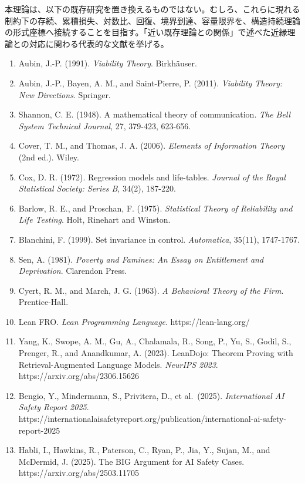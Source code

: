 \documentclass[12pt,a4paper]{article}
\begin{document}
本理論は、以下の既存研究を置き換えるものではない。むしろ、これらに現れる制約下の存続、累積損失、対数比、回復、境界到達、容量限界を、構造持続理論の形式座標へ接続することを目指す。「近い既存理論との関係」で述べた近縁理論との対応に関わる代表的な文献を挙げる。

\begin{enumerate}
\def\labelenumi{\arabic{enumi}.}
\tightlist
\item
  Aubin, J.-P. (1991). \emph{Viability Theory}. Birkhäuser.
\item
  Aubin, J.-P., Bayen, A. M., and Saint-Pierre, P. (2011). \emph{Viability Theory: New Directions}. Springer.
\item
  Shannon, C. E. (1948). A mathematical theory of communication. \emph{The Bell System Technical Journal}, 27, 379-423, 623-656.
\item
  Cover, T. M., and Thomas, J. A. (2006). \emph{Elements of Information Theory} (2nd ed.). Wiley.
\item
  Cox, D. R. (1972). Regression models and life-tables. \emph{Journal of the Royal Statistical Society: Series B}, 34(2), 187-220.
\item
  Barlow, R. E., and Proschan, F. (1975). \emph{Statistical Theory of Reliability and Life Testing}. Holt, Rinehart and Winston.
\item
  Blanchini, F. (1999). Set invariance in control. \emph{Automatica}, 35(11), 1747-1767.
\item
  Sen, A. (1981). \emph{Poverty and Famines: An Essay on Entitlement and Deprivation}. Clarendon Press.
\item
  Cyert, R. M., and March, J. G. (1963). \emph{A Behavioral Theory of the Firm}. Prentice-Hall.
\item
  Lean FRO. \emph{Lean Programming Language}. https://lean-lang.org/
\item
  Yang, K., Swope, A. M., Gu, A., Chalamala, R., Song, P., Yu, S., Godil, S., Prenger, R., and Anandkumar, A. (2023). LeanDojo: Theorem Proving with Retrieval-Augmented Language Models. \emph{NeurIPS 2023}. https://arxiv.org/abs/2306.15626
\item
  Bengio, Y., Mindermann, S., Privitera, D., et al.~(2025). \emph{International AI Safety Report 2025}. https://internationalaisafetyreport.org/publication/international-ai-safety-report-2025
\item
  Habli, I., Hawkins, R., Paterson, C., Ryan, P., Jia, Y., Sujan, M., and McDermid, J. (2025). The BIG Argument for AI Safety Cases. https://arxiv.org/abs/2503.11705
\end{enumerate}
\end{document}

